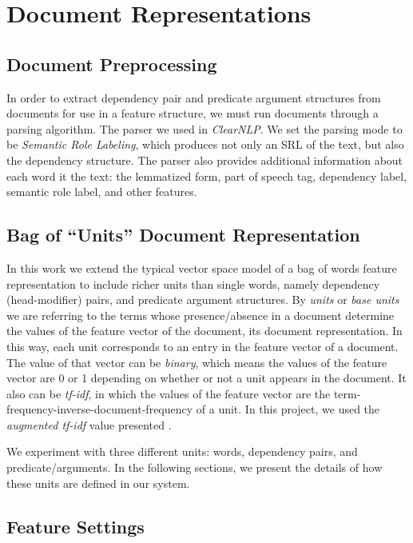 \documentclass[11pt]{article}
\begin{document}
\section{Document Representations}


\subsection{Document Preprocessing}

In order to extract dependency pair and predicate argument structures from documents for use in a feature structure, we must run documents through a parsing algorithm. The parser we used in \emph{ClearNLP}. We set the parsing mode to be \emph{Semantic Role Labeling}, which produces not only an SRL of the text, but also the dependency structure. The parser also provides additional information about each word it the text: the lemmatized form, part of speech tag, dependency label, semantic role label, and other features. 

\subsection{Bag of ``Units'' Document Representation}

In this work we extend the typical vector space model of a bag of words feature representation to include richer units than single words, namely dependency (head-modifier) pairs, and predicate argument structures. By \emph{units} or \emph{base units} we are referring to the terms whose presence/absence in a document determine the values of the feature vector of the document, its document representation. In this way, each unit corresponds to an entry in the feature vector of a document. The value of that vector can be \textit{binary}, which means the values of the feature vector are 0 or 1 depending on whether or not a unit appears in the document. It  also can be \textit{tf-idf}, in which the values of the feature vector are the term-frequency-inverse-document-frequency of a unit. In this project, we used the \textit{augmented tf-idf} value presented \cite{Polettini2004}.

We experiment with three different units: words, dependency pairs, and predicate/arguments. In the following sections, we present the details of how these units are defined in our system.

\subsection{Feature Settings}
\end{document}
